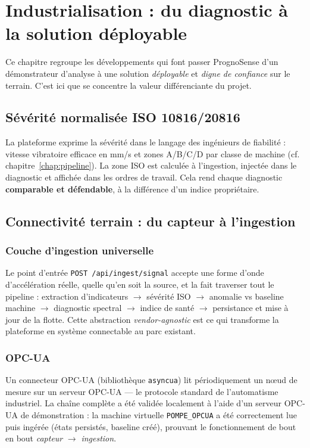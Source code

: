 \chapter{Industrialisation : du diagnostic à la solution déployable}
\label{chap:indus}

Ce chapitre regroupe les développements qui font passer PrognoSense d'un démonstrateur
d'analyse à une solution \emph{déployable} et \emph{digne de confiance} sur le terrain.
C'est ici que se concentre la valeur différenciante du projet.

\section{Sévérité normalisée ISO 10816/20816}
La plateforme exprime la sévérité dans le langage des ingénieurs de fiabilité : vitesse
vibratoire efficace en mm/s et zones A/B/C/D par classe de machine (cf.
chapitre~\ref{chap:pipeline}). La zone ISO est calculée à l'ingestion, injectée dans le
diagnostic et affichée dans les ordres de travail. Cela rend chaque diagnostic
\textbf{comparable et défendable}, à la différence d'un indice propriétaire.

\section{Connectivité terrain : du capteur à l'ingestion}
\subsection{Couche d'ingestion universelle}
Le point d'entrée \texttt{POST /api/ingest/signal} accepte une forme d'onde
d'accélération réelle, quelle qu'en soit la source, et la fait traverser tout le pipeline :
extraction d'indicateurs $\rightarrow$ sévérité ISO $\rightarrow$ anomalie vs baseline
machine $\rightarrow$ diagnostic spectral $\rightarrow$ indice de santé $\rightarrow$
persistance et mise à jour de la flotte. Cette abstraction \emph{vendor-agnostic} est ce qui
transforme la plateforme en système connectable au parc existant.

\subsection{OPC-UA}
Un connecteur OPC-UA (bibliothèque \texttt{asyncua}) lit périodiquement un n\oe ud de mesure
sur un serveur OPC-UA --- le protocole standard de l'automatisme industriel. La chaîne
complète a été validée localement à l'aide d'un serveur OPC-UA de démonstration : la machine
virtuelle \texttt{POMPE\_OPCUA} a été correctement lue puis ingérée (états persistés,
baseline créé), prouvant le fonctionnement de bout en bout \emph{capteur} $\rightarrow$
\emph{ingestion}.


